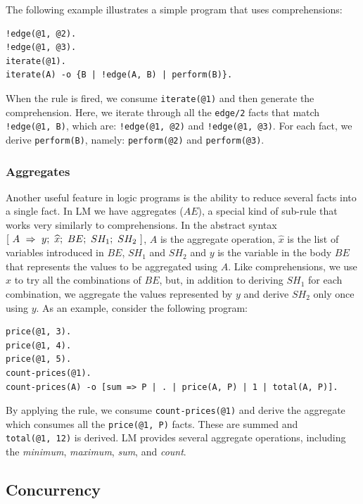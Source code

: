 The following example illustrates a simple program that uses comprehensions:

{\footnotesize
\begin{Verbatim}
!edge(@1, @2).
!edge(@1, @3).
iterate(@1).
iterate(A) -o {B | !edge(A, B) | perform(B)}.
\end{Verbatim}
}

When the rule is fired, we consume \texttt{iterate(@1)} and then generate the comprehension. Here, we iterate through
all the \texttt{edge/2} facts that match \texttt{!edge(@1, B)}, which are: \texttt{!edge(@1, @2)} and \texttt{!edge(@1, @3)}.
For each fact, we derive \texttt{perform(B)}, namely: \texttt{perform(@2)} and \texttt{perform(@3)}.

\subsubsection{Aggregates}

Another useful feature in logic programs is the ability to reduce several facts into a single fact.
In LM we have aggregates ($AE$), a special kind of sub-rule that works very similarly to comprehensions.
In the abstract syntax $[~A~\Rightarrow~y;~\widehat{x};~BE;~SH_1;~SH_2~]$, $A$ is the aggregate operation, $\widehat{x}$ is the list of variables
introduced in $BE$, $SH_1$ and $SH_2$ and $y$ is the variable in the body
$BE$ that represents the values to be aggregated using $A$. Like comprehensions,
we use $\widehat{x}$ to try all the combinations of $BE$, but, in addition to deriving $SH_1$ for each combination,
we aggregate the values represented by $y$ and derive $SH_2$ only once using $y$.
As an example, consider the following program:

{\footnotesize
\begin{Verbatim}
price(@1, 3).
price(@1, 4).
price(@1, 5).
count-prices(@1).
count-prices(A) -o [sum => P | . | price(A, P) | 1 | total(A, P)].
\end{Verbatim}
}

By applying the rule, we consume \texttt{count-prices(@1)} and
derive the aggregate which consumes all the \texttt{price(@1, P)} facts.
These are summed and \texttt{total(@1,~12)} is derived.  
LM provides several aggregate operations, including the \emph{minimum}, \emph{maximum}, \emph{sum}, and \emph{count}.

\subsection{Concurrency}

